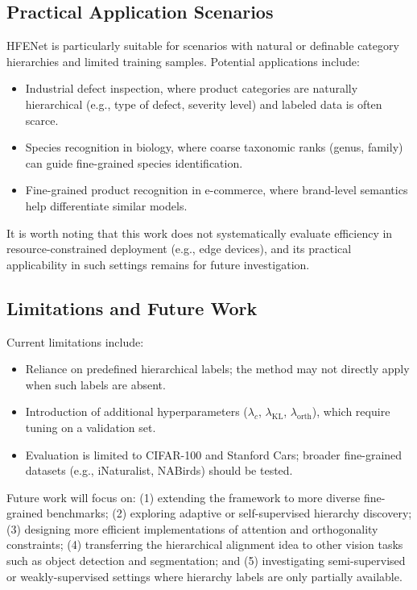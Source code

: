 \documentclass[pdflatex,sn-mathphys-num]{sn-jnl}
\theoremstyle{thmstyleone}%
\theoremstyle{thmstyletwo}%
\theoremstyle{thmstylethree}%
\begin{document}
\subsection{Practical Application Scenarios}
HFENet is particularly suitable for scenarios with natural or definable category hierarchies and limited training samples. Potential applications include:
\begin{itemize}
    \item Industrial defect inspection, where product categories are naturally hierarchical (e.g., type of defect, severity level) and labeled data is often scarce.
    \item Species recognition in biology, where coarse taxonomic ranks (genus, family) can guide fine-grained species identification.
    \item Fine-grained product recognition in e-commerce, where brand-level semantics help differentiate similar models.
\end{itemize}
It is worth noting that this work does not systematically evaluate efficiency in resource-constrained deployment (e.g., edge devices), and its practical applicability in such settings remains for future investigation.

\subsection{Limitations and Future Work}
Current limitations include:
\begin{itemize}
    \item Reliance on predefined hierarchical labels; the method may not directly apply when such labels are absent.
    \item Introduction of additional hyperparameters ($\lambda_c$, $\lambda_{\mathrm{KL}}$, $\lambda_{\mathrm{orth}}$), which require tuning on a validation set.
    \item Evaluation is limited to CIFAR-100 and Stanford Cars; broader fine-grained datasets (e.g., iNaturalist, NABirds) should be tested.
\end{itemize}
Future work will focus on: (1) extending the framework to more diverse fine-grained benchmarks; (2) exploring adaptive or self-supervised hierarchy discovery; (3) designing more efficient implementations of attention and orthogonality constraints; (4) transferring the hierarchical alignment idea to other vision tasks such as object detection and segmentation; and (5) investigating semi-supervised or weakly-supervised settings where hierarchy labels are only partially available.
\end{document}
